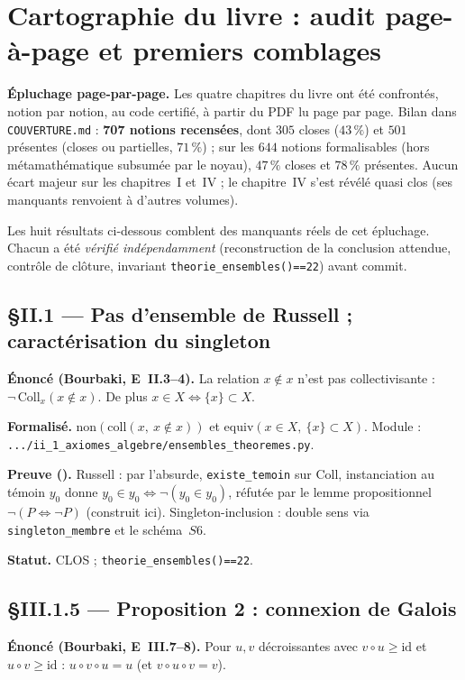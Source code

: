 \section{Cartographie du livre : audit page-à-page et premiers comblages}

\textbf{Épluchage page-par-page.} Les quatre chapitres du livre ont été confrontés,
notion par notion, au code certifié, à partir du PDF lu page par page. Bilan dans
\texttt{COUVERTURE.md} : \textbf{707 notions recensées}, dont $305$ closes ($43\,\%$)
et $501$ présentes (closes ou partielles, $71\,\%$) ; sur les $644$ notions
formalisables (hors métamathématique subsumée par le noyau), $47\,\%$ closes et
$78\,\%$ présentes. Aucun écart majeur sur les chapitres~I et~IV ; le chapitre~IV
s'est révélé quasi clos (ses manquants renvoient à d'autres volumes).

Les huit résultats ci-dessous comblent des manquants réels de cet épluchage. Chacun
a été \emph{vérifié indépendamment} (reconstruction de la conclusion attendue,
contrôle de clôture, invariant \texttt{theorie\_ensembles()==22}) avant commit.

\subsection{§II.1 --- Pas d'ensemble de Russell ; caractérisation du singleton}
\textbf{Énoncé (Bourbaki, E~II.3--4).} La relation $x\notin x$ n'est pas
collectivisante : $\neg\,\mathrm{Coll}_x(x\notin x)$. De plus
$x\in X \Leftrightarrow \{x\}\subset X$.

\textbf{Formalisé.} $\mathrm{non}(\mathrm{coll}(x,\ x\notin x))$ et
$\mathrm{equiv}(x\in X,\ \{x\}\subset X)$.
Module : \texttt{.../ii\_1\_axiomes\_algebre/ensembles\_theoremes.py}.

\textbf{Preuve (\Nstar).} Russell : par l'absurde, \texttt{existe\_temoin} sur
$\mathrm{Coll}$, instanciation au témoin $y_0$ donne $y_0\in y_0\Leftrightarrow\neg(y_0\in y_0)$,
réfutée par le lemme propositionnel $\neg(P\Leftrightarrow\neg P)$ (construit ici).
Singleton-inclusion : double sens via \texttt{singleton\_membre} et le schéma~$S6$.

\textbf{Statut.} CLOS ; \texttt{theorie\_ensembles()==22}.

\subsection{§III.1.5 --- Proposition 2 : connexion de Galois}
\textbf{Énoncé (Bourbaki, E~III.7--8).} Pour $u,v$ décroissantes avec $v\circ u\geq\mathrm{id}$
et $u\circ v\geq\mathrm{id}$ : $u\circ v\circ u = u$ (et $v\circ u\circ v = v$).


